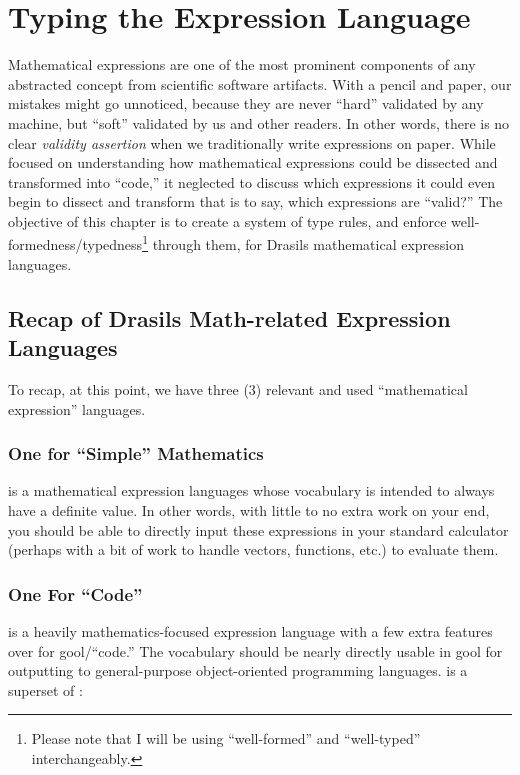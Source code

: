 \chapter{Typing the Expression Language}
\label{chap:typedExpr}

Mathematical expressions are one of the most prominent components of any
abstracted concept from scientific software artifacts. With a pencil and paper,
our mistakes might go unnoticed, because they are never ``hard'' validated by
any machine, but ``soft'' validated by us and other readers. In other words,
there is no clear \textit{validity assertion} when we traditionally write
expressions on paper. While  focused on understanding how
mathematical expressions could be dissected and transformed into ``code,'' it
neglected to discuss which expressions it could even begin to dissect and
transform \textemdash{} that is to say, which expressions are ``valid?'' The
objective of this chapter is to create a system of type rules, and enforce
well-formedness/typedness\footnote{Please note that I will be using
      ``well-formed'' and ``well-typed'' interchangeably.} through them, for Drasils
mathematical expression languages.

\section{Recap of Drasils Math-related Expression Languages}

To recap, at this point, we have three (3) relevant and used ``mathematical
expression'' languages.

\subsection{One for \textquotedblleft{}Simple\textquotedblright{} Mathematics}

\Expr{} is a mathematical expression languages whose vocabulary is intended to
always have a definite value. In other words, with little to no extra work on
your end, you should be able to directly input these expressions in your
standard calculator (perhaps with a bit of work to handle vectors, functions,
etc.) to evaluate them.

\subsection{One For \textquotedblleft{}Code\textquotedblright{}}

\CodeExpr{} is a heavily mathematics-focused expression language with a few
extra features over \Expr{} for \acs{gool}/``code.'' The vocabulary should be
nearly directly usable in \acs{gool} for outputting to general-purpose
object-oriented programming languages. \CodeExpr{} is a superset of \Expr{}:

